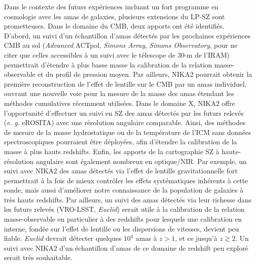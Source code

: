 Dans le contexte des futurs expériences incluant un fort programme en cosmologie avec les amas de galaxies, plusieurs extensions du LP-SZ sont prometteuses.
%
Dans le domaine du CMB, deux apports ont été identifiés. D'abord, un suivi d'un échantillon d'amas détectés par les prochaines expériences CMB au sol (\emph{Advanced} ACTpol, \emph{Simons Array}, \emph{Simons Observatory}, pour ne citer que celles accessibles à un suivi avec le télescope de 30-m de l'IRAM) permettrait d'étendre à plus basse masse la calibration de la relation masse-observable et du profil de pression moyen. Par ailleurs, NIKA2 pourrait obtenir la première reconstruction de l'effet de lentille sur le CMB par un amas individuel, ouvrant une nouvelle voie pour la mesure de la masse des amas étendant les méthodes cumulatives récemment utilisées. 
%
Dans le domaine X, NIKA2 offre l'opportunité d'effectuer un suivi en SZ des amas détectés par les futurs relevés (\emph{e. g. } eROSITA) avec une résolution angulaire comparable. Ainsi, des méthodes de mesure de la masse hydrostatique ou de la température de l'ICM sans données spectroscopiques pourraient être déployées, afin d'étendre la calibration de la masse à plus hauts redshifts.
%
Enfin, les apports de la cartographie SZ à haute-résolution angulaire sont également nombreux en optique/NIR. Par exemple, un suivi avec NIKA2 des amas détectés via l'effet de lentille gravitationnelle fort permettrait à la fois de mieux contrôler les effets systématiques inhérents à cette sonde, mais aussi d'améliorer notre connaissance de la population de galaxies à très hauts redshifts. Par ailleurs, un suivi des amas détectés via leur richesse dans les futurs relevés (VRO-LSST, \emph{Euclid}) serait utile à la calibration de la relation masse-observable en particulier à des redshifts pour lesquels une calibration en interne, fondée sur l'effet de lentille ou les dispersions de vitesses, devient peu fiable. \emph{Euclid} devrait détecter quelques $10^{4}$ amas à $z>1$, et ce jusqu'à $z\gtrsim 2$. Un suivi avec NIKA2 d'un échantillon d'amas de ce domaine de redshift peu exploré serait très souhaitable.        
   

